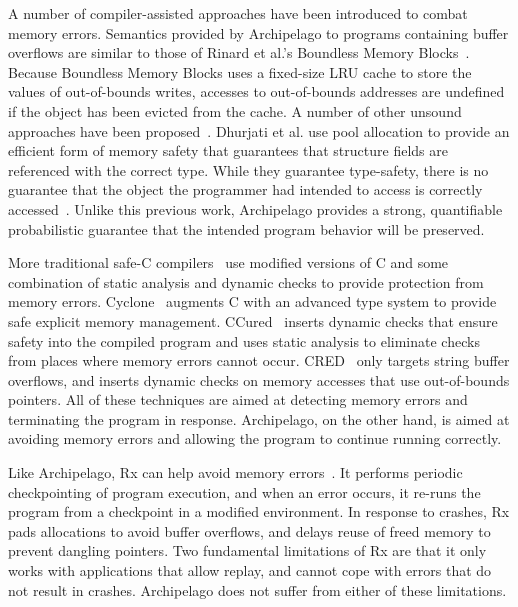 \documentclass{acm_proc_article-sp}
\begin{document}
A number of compiler-assisted approaches have been introduced to
combat memory errors. Semantics provided by Archipelago to programs
containing buffer overflows are similar to those of Rinard et al.'s
Boundless Memory Blocks~\cite{rinard04dynamic}. Because Boundless
Memory Blocks uses a fixed-size LRU cache to store the values of
out-of-bounds writes, accesses to out-of-bounds addresses are undefined
if the object has been evicted from the cache. A number of other
unsound approaches have been proposed~\cite{dhur03,failure-oblivious}.
Dhurjati et al. use pool allocation to provide an efficient form of
memory safety that guarantees that structure fields are referenced
with the correct type.  While they guarantee type-safety, there is no
guarantee that the object the programmer had intended to access is
correctly accessed~\cite{dhur03}.  Unlike this previous work,
Archipelago provides a strong, quantifiable probabilistic guarantee
that the intended program behavior will be preserved.


More traditional safe-C compilers~\cite{swamy05experience, 503286,
cred} use modified versions of C and some combination of static
analysis and dynamic checks to provide protection from memory
errors. Cyclone~\cite{713871, swamy05experience} augments C with an
advanced type system to provide safe explicit memory
management. CCured~\cite{503286} inserts dynamic checks that ensure
safety into the compiled program and uses static analysis to eliminate
checks from places where memory errors cannot occur. CRED~\cite{cred}
only targets string buffer overflows, and inserts dynamic checks on
memory accesses that use out-of-bounds pointers. All of these
techniques are aimed at detecting memory errors and terminating the
program in response. Archipelago, on the other hand, is aimed at
avoiding memory errors and allowing the program to continue running
correctly.

Like Archipelago, Rx can help avoid memory errors~\cite{rx}. It
performs periodic checkpointing of program execution, and when an
error occurs, it re-runs the program from a checkpoint in a modified
environment. In response to crashes, Rx pads allocations to avoid
buffer overflows, and delays reuse of freed memory to prevent dangling
pointers. Two fundamental limitations of Rx are that it only works
with applications that allow replay, and cannot cope with errors that
do not result in crashes. Archipelago does not suffer from either of
these limitations.
\end{document}

